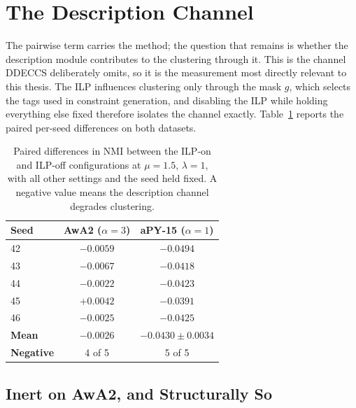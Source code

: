 \section{The Description Channel}
\label{sec:repro_channel}

The pairwise term carries the method; the question that remains is whether the description module contributes to the clustering through it. This is the channel DDECCS deliberately omits, so it is the measurement most directly relevant to this thesis. The ILP influences clustering only through the mask $g$, which selects the tags used in constraint generation, and disabling the ILP while holding everything else fixed therefore isolates the channel exactly. Table~\ref{tab:repro_ilp_deltas} reports the paired per-seed differences on both datasets.

\begin{table}[H]
    \centering
    \footnotesize
    \caption[Paired ILP on/off differences in NMI]{Paired differences in NMI between the ILP-on and ILP-off configurations at $\mu = 1.5$, $\lambda = 1$, with all other settings and the seed held fixed. A negative value means the description channel degrades clustering.}
    \label{tab:repro_ilp_deltas}
    \begin{tabular}{lcc}
        \hline
        \textbf{Seed} & \textbf{AwA2 ($\alpha = 3$)} & \textbf{aPY-15 ($\alpha = 1$)} \\
        \hline
        42 & $-0.0059$ & $-0.0494$ \\
        43 & $-0.0067$ & $-0.0418$ \\
        44 & $-0.0022$ & $-0.0423$ \\
        45 & $+0.0042$ & $-0.0391$ \\
        46 & $-0.0025$ & $-0.0425$ \\
        \hline
        \textbf{Mean} & $-0.0026$ & $\mathbf{-0.0430 \pm 0.0034}$ \\
        \textbf{Negative} & 4 of 5 & 5 of 5 \\
        \hline
    \end{tabular}
\end{table}


\subsection{Inert on AwA2, and Structurally So}
\label{subsec:repro_channel_awa2}

